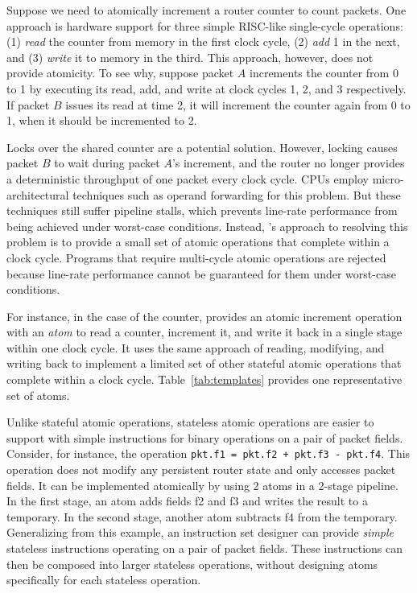 Suppose we need to atomically increment a router counter to count packets. One
approach is hardware support for three simple RISC-like single-cycle
operations: (1) \textit{read} the counter from memory in the first clock cycle,
(2) \textit{add} 1 in the next, and (3) \textit{write} it to memory in the
third.  This approach, however, does not provide atomicity. To see why, suppose
packet $A$ increments the counter from 0 to 1 by executing its read, add, and
write at clock cycles 1, 2, and 3 respectively.  If packet $B$ issues its read
at time 2, it will increment the counter again from 0 to 1, when it should be
incremented to 2.

Locks over the shared counter are a potential solution.  However, locking
causes packet $B$ to wait during packet $A$'s increment, and the router no
longer provides a deterministic throughput of one packet every clock cycle. CPUs employ
micro-architectural techniques such as operand forwarding for this problem. But
these techniques still suffer pipeline stalls, which prevents line-rate
performance from being achieved under worst-case conditions. Instead,
\absmachine's approach to resolving this problem is to provide a small set of
atomic operations that complete within a clock cycle. Programs that require
multi-cycle atomic operations are rejected because line-rate performance cannot
be guaranteed for them under worst-case conditions.

For instance, in the case of the counter, \absmachine provides an atomic
increment operation with an {\em atom} to read a counter, increment it, and
write it back in a single stage within one clock cycle. It uses the same
approach of reading, modifying, and writing back to implement a limited set of
other stateful atomic operations that complete within a clock cycle.
Table~\ref{tab:templates} provides one representative set of atoms.

Unlike stateful atomic operations, stateless atomic operations are easier to
support with simple instructions for binary operations on a pair of packet
fields.  Consider, for instance, the operation {\tt pkt.f1 = pkt.f2 + pkt.f3 -
pkt.f4}.  This operation does not modify any persistent router state and only
accesses packet fields. It can be implemented atomically by using 2 atoms in a
2-stage pipeline. In the first stage, an atom adds fields f2 and f3 and writes
the result to a temporary. In the second stage, another atom subtracts f4 from
the temporary. Generalizing from this example, an instruction set designer can
provide {\em simple} stateless instructions operating on a pair of packet
fields. These instructions can then be composed into larger stateless
operations, without designing atoms specifically for each stateless operation.

